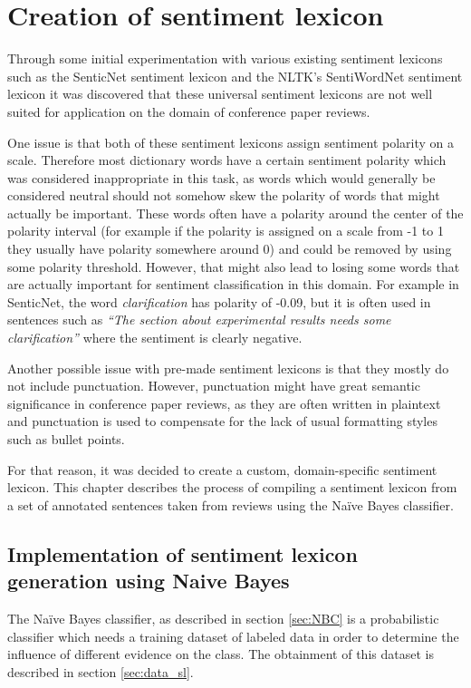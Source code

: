 \chapter{Creation of sentiment lexicon}
Through some initial experimentation with various existing sentiment lexicons such as the SenticNet sentiment lexicon and the NLTK's SentiWordNet sentiment lexicon it was discovered that these universal sentiment lexicons are not well suited for application on the domain of conference paper reviews.

One issue is that both of these sentiment lexicons assign sentiment polarity on a scale. Therefore most dictionary words have a certain sentiment polarity which was considered inappropriate in this task, as words which would generally be considered neutral should not somehow skew the polarity of words that might actually be important. These words often have a polarity around the center of the polarity interval (for example if the polarity is assigned on a scale from -1 to 1 they usually have polarity somewhere around 0) and could be removed by using some polarity threshold. However, that might also lead to losing some words that are actually important for sentiment classification in this domain. For example in SenticNet, the word \textit{clarification} has polarity of -0.09, but it is often used in sentences such as \textit{``The section about experimental results needs some clarification''} where the sentiment is clearly negative.

Another possible issue with pre-made sentiment lexicons is that they mostly do not include punctuation. However, punctuation might have great semantic significance in conference paper reviews, as they are often written in plaintext and punctuation is used to compensate for the lack of usual formatting styles such as bullet points. 


For that reason, it was decided to create a custom, domain-specific sentiment lexicon. This chapter describes the process of compiling a sentiment lexicon from a set of annotated sentences taken from reviews using the Na\"ive Bayes classifier.
\section{Implementation of sentiment lexicon generation using Naive Bayes}
The Na\"ive Bayes classifier, as described in section \ref{sec:NBC} is a probabilistic classifier which needs a training dataset of labeled data in order to determine the influence of different evidence on the class. The obtainment of this dataset is described in section \ref{sec:data_sl}.

